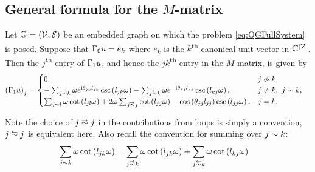 \subsection{General formula for the $M$-matrix} \label{ssec:MMatrixResult}
\begin{prop} \label{prop:M-MatrixEntries}
	Let $\mathbb{G}=\left( \mathcal{V},\mathcal{E} \right)$ be an embedded graph on which the problem \eqref{eq:QGFullSystem} is posed.
	Suppose that $\Gamma_0 u = e_k$ where $e_k$ is the $k$\textsuperscript{th} canonical unit vector in $\mathbb{C}^{\left\lvert \mathcal{V} \right\rvert}$.
	Then the $j$\textsuperscript{th} entry of $\Gamma_1 u$, and hence the $jk$\textsuperscript{th} entry in the $M$-matrix, is given by
	\begin{align*}
		\bracs{\nmap u}_j &= 
		\begin{cases}
			0,	
			& j \not\con k, \\
			-\sum_{j\conLeft k} \omega e^{\rmi\qm_{jk}l_{jk}} \csc\bracs{l_{jk}\omega} 
			- \sum_{j\conRight k} \omega e^{-\rmi\qm_{kj}l_{kj}} \csc\bracs{l_{kj}\omega},
			& j\neq k, \ j\con k, \\
			\sum_{j\con l} \omega\cot\bracs{l_{jl}\omega}
			+ 2\omega\sum_{j\conLeft j} \cot\bracs{l_{jj}\omega} - \cos\bracs{\qm_{jj}l_{jj}}\csc\bracs{l_{jj}\omega},
			& j=k.
		\end{cases}
	\end{align*}
\end{prop}
Note the choice of $j\conLeft j$ in the contributions from loops is simply a convention, $j\conRight j$ is equivalent here.
Also recall the convention for summing over $j\sim k$:
\begin{align*}
	\sum_{j\con k} \omega\cot\bracs{l_{jk}\omega} &= \sum_{j\conLeft k} \omega\cot\bracs{l_{jk}\omega}	+ \sum_{j\conRight k} \omega\cot\bracs{l_{kj}\omega}
\end{align*}
